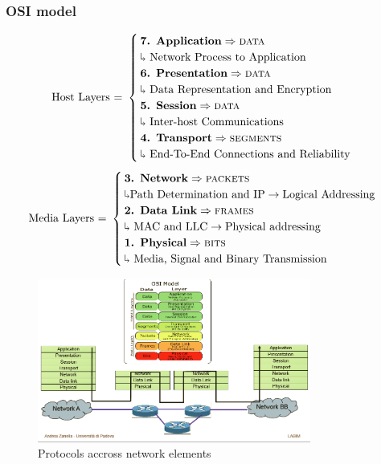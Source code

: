 \subsubsection{OSI model}
\begin{equation}\text{Host Layers = }
\begin{cases}
\text{\textbf{7. Application}} \Rightarrow \text{\textsc{data}} \\ \rotatebox[origin=c]{180}{$\Lsh$} \text{ Network Process to Application}\\
\text{\textbf{6. Presentation}} \Rightarrow \text{\textsc{data}}\\ \rotatebox[origin=c]{180}{$\Lsh$}
\text{ Data Representation and Encryption}\\
\text{\textbf{5. Session}} \Rightarrow \text{\textsc{data}}\\ \rotatebox[origin=c]{180}{$\Lsh$}
\text{ Inter-host Communications}\\
\text{\textbf{4. Transport}}\Rightarrow \text{\textsc{segments}}\\\rotatebox[origin=c]{180}{$\Lsh$} \text{ End-To-End Connections and Reliability}\\
\end{cases}\\
\end{equation}
\begin{equation}\text{Media Layers = }
\begin{cases}
\text{\textbf{3. Network}} \Rightarrow \text{\textsc{packets}}\\ \rotatebox[origin=c]{180}{$\Lsh$}
\text{Path Determination and IP} \rightarrow \text{Logical Addressing}\\
\text{\textbf{2. Data Link}} \Rightarrow \text{\textsc{frames}}\\ \rotatebox[origin=c]{180}{$\Lsh$}
\text{ MAC and LLC} \rightarrow \text{Physical addressing}\\
\text{\textbf{1. Physical}}\Rightarrow \text{\textsc{bits}}\\\rotatebox[origin=c]{180}{$\Lsh$} \text{ Media, Signal and Binary Transmission}
\end{cases}
\end{equation}

\begin{figure}
\centering\includegraphics[width=0.8\textwidth]{OSImodel.png}
\caption{\label{OSImodel.png}Protocols accross network elements}
\end{figure}

